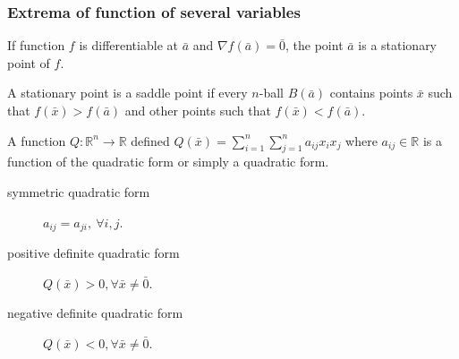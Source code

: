 \subsubsection{Extrema of function of several variables}
\begin{definition}
	If function $f$ is differentiable at $\bar{a}$ and $\nabla f(\bar{a}) = \bar{0}$, the point $\bar{a}$ is a stationary point of $f$.
\end{definition}

\begin{definition}
	A stationary point is a saddle point if every $n$-ball $B(\bar{a})$ contains points $\bar{x}$ such that $f(\bar{x}) > f(\bar{a})$ and other points such that $f(\bar{x}) < f(\bar{a})$.
\end{definition}

\begin{definition}
	A function $Q : \mathbb{R}^n \to \mathbb{R}$ defined $Q(\bar{x}) = \sum_{i=1}^n \sum_{j=1}^n a_{ij}x_ix_j$ where $a_{ij} \in \mathbb{R}$ is a function of the quadratic form or simply a quadratic form.
\begin{description}
	\item[symmetric quadratic form] $a_{ij} = a_{ji},\ \forall i,j$. 
	\item[positive definite quadratic form] $Q(\bar{x}) > 0, \forall \bar{x} \ne \bar{0}$. 
	\item[negative definite quadratic form] $Q(\bar{x}) < 0, \forall \bar{x} \ne \bar{0}$. 
\end{description}
\end{definition}

